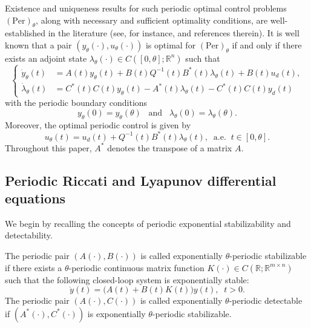 \documentclass{IEEEtran}
\begin{document}
	Existence and uniqueness results for such periodic optimal control problems $(\text{Per})_\theta$, along with necessary and sufficient optimality conditions, are well-established in the literature (see, for instance, \cite{RM}  and references therein).
	It is well known that a pair $(y_\theta(\cdot),u_\theta(\cdot))$ is optimal for $(\text{Per})_\theta$ if and only if there exists an adjoint state $\lambda_\theta(\cdot)\in C([0,\theta];\mathbb R^n)$ such that
	\begin{equation}\label{xiaoextremalsystLQ}
		\left\{
		\begin{aligned}
			\dot{y}_\theta(t) &= A(t)y_\theta(t) + B(t)Q^{-1}(t)B^*(t)\lambda_\theta(t) 
			+ B(t)u_d(t), \\
			\dot{\lambda}_\theta(t) &= C^*(t)C(t)y_\theta(t) - A^*(t)\lambda_\theta(t) 
			- C^*(t)C(t)y_d(t)
		\end{aligned}
		\right.
	\end{equation}
	with the periodic boundary conditions
	\begin{equation}\label{du12061}
		y_\theta(0)=y_\theta(\theta)\;\;\;\text{and}\;\;\;
		\lambda_\theta(0)=\lambda_\theta(\theta).
	\end{equation}
	Moreover, the optimal periodic control is given by 
	\begin{equation}\label{xiao61718}
		u_\theta(t)=u_d(t)+Q^{-1}(t)B^*(t)\lambda_\theta(t),\;\;\text{a.e.}\;\;t\in[0,\theta].
	\end{equation}
	Throughout this paper,  $A^*$ denotes the transpose of a matrix $A$.
	\subsection{Periodic Riccati and Lyapunov differential equations}\label{prlde}
	
	We begin by recalling the concepts of periodic exponential stabilizability and detectability.
	\begin{definition}\label{du1206}
		The periodic pair $(A(\cdot),B(\cdot))$ is called exponentially $\theta$-periodic stabilizable  
		if there exists a $\theta$-periodic continuous matrix function
		$K(\cdot)\in C(\mathbb R;\mathbb R^{m\times n})$ such that the following closed-loop system
		is exponentially stable:
		\begin{equation}
			\dot y(t)=\big(A(t)+B(t)K(t)\big)y(t),\;\;t>0.
		\end{equation} 
		The periodic pair $(A(\cdot), C(\cdot))$ is called exponentially $\theta$-periodic detectable 
		if $(A^*(\cdot),C^*(\cdot))$ is exponentially $\theta$-periodic stabilizable. 
	\end{definition}
	
\end{document}
